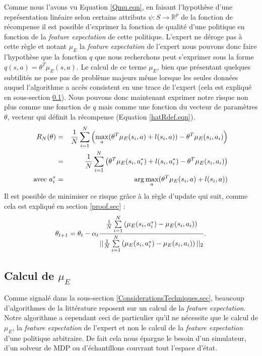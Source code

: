 \documentclass[publibook-draft]{CAp2012}
\begin{document}
Comme nous l'avons vu Equation \eqref{Qmu.eqn}, en faisant l'hypothèse d'une représentation linéaire selon certains attributs $\psi : S\rightarrow \mathbb{R}^p$ de la fonction de récompense il est possible d'exprimer la fonction de qualité d'une politique en fonction de la {\it feature expectation} de cette politique. L'expert ne déroge pas à cette règle et notant $\mu_E$ la {\it feature expectation} de l'expert nous pouvons donc faire l'hypothèse que la fonction $q$ que nous recherchons peut s'exprimer sous la forme $q(s,a) = \theta^T\mu_E(s,a)$. Le calcul de ce terme $\mu_E$, bien que présentant quelques subtilités ne pose pas de problème majeurs même lorsque les seules données auquel l'algorithme a accès consistent en une trace de l'expert (cela est expliqué en sous-section \ref{calculmu.sec}). Nous pouvons donc maintenant exprimer notre risque non plus comme une fonction de $q$ mais comme une fonction du vecteur de paramètres $\theta$, vecteur qui définit la récompense (Equation \eqref{hatRdef.eqn}).
   \begin{eqnarray}
   R_N(\theta)  &=& {1\over N} \sum_{i=1}^N\left(\max_a(\theta ^T \mu_E(s_i,a) + l(s_i,a)) - \theta ^T \mu_E(s_i,a_i) \right)\\
   &=& {1\over N} \sum_{i=1}^N\left(\theta ^T \mu_E(s_i,a^*_i) + l(s_i,a^*_i) - \theta ^T \mu_E(s_i,a_i) \right)\\
\textrm{avec } a^*_i &=& \arg\max_a(\theta ^T \mu_E(s_i,a) + l(s_i,a))
   \end{eqnarray}
   Il est possible de minimiser ce risque grâce à la règle d'update qui suit, comme cela est expliqué en section \ref{proof.sec} :
   \begin{equation}
   \theta_{t+1} = \theta_t -\alpha_t{{1\over N}\sum\limits_{i=1}^N\left(\mu_E(s_i,a^*_i) - \mu_E(s_i,a_i)\right)\over ||{1\over N}\sum\limits_{i=1}^N\left(\mu_E(s_i,a^*_i) - \mu_E(s_i,a_i)\right)||_2}.
   \end{equation}
\subsection{Calcul de $\mu_E$}
\label{calculmu.sec}
Comme signalé dans la sous-section \ref{ConsiderationsTechniques.sec}, beaucoup d'algorithmes de la littérature reposent sur un calcul de la {\it feature expectation}. Notre algorithme a cependant ceci de particulier qu'il ne nécessite que le calcul de $\mu_E$, la {\it feature expectation} de l'expert et non le calcul de la {\it feature expectation} d'une politique arbitraire. De fait cela nous épargne le besoin d'un simulateur, d'un solveur de MDP ou d'échantillons couvrant tout l'espace d'état.\\
\end{document}
